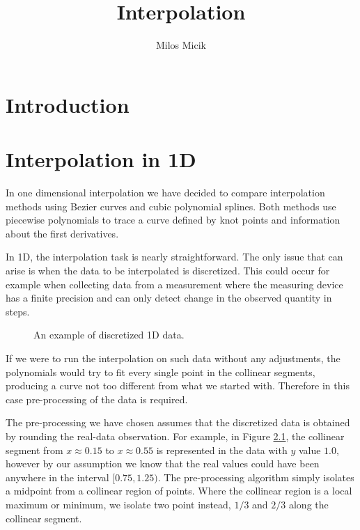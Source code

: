 \documentclass[a4paper,10pt]{report}
\title{Interpolation} %
\author{Milos Micik}
\begin{document}
\maketitle

\begin{abstract}
\end{abstract}

\chapter{Introduction}

\chapter{Interpolation in 1D}
In one dimensional interpolation we have decided to compare interpolation methods using Bezier curves and cubic polynomial splines. Both methods use piecewise polynomials to trace a curve defined by knot points and information about the first derivatives.


In 1D, the interpolation task is nearly straightforward. The only issue that can arise is when the data to be interpolated is discretized. This could occur for example when collecting data from a measurement where the measuring device has a finite precision and can only detect change in the observed quantity in steps.
\begin{figure}[h]
 \centering
 
 \caption{An example of discretized 1D data.}
 \label{fig:1D_fun}
\end{figure}

If we were to run the interpolation on such data without any adjustments, the polynomials would try to fit every single point in the collinear segments, producing a curve not too different from what we started with. Therefore in this case pre-processing of the data is required.

The pre-processing we have chosen assumes that the discretized data is obtained by rounding the real-data observation. For example, in Figure \ref{fig:1D_fun}, the collinear segment from $x\approx0.15$ to $x\approx0.55$ is represented in the data with $y$ value $1.0$, however by our assumption we know that the real values could have been anywhere in the interval $[0.75, 1.25)$. The pre-processing algorithm simply isolates a midpoint from a collinear region of points. Where the collinear region is a local maximum or minimum, we isolate two point instead, $1/3$ and $2/3$ along the collinear segment.
\end{document}
